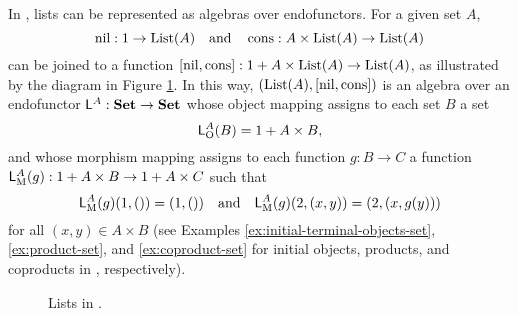\begin{example}
  \label{ex:algebra-list}


  In \set, lists can be represented as algebras over endofunctors. For
  a given set $A$,
  \begin{equation*}
    \operatorname{nil}: 1 \to \text{List}(A)
    \quad
    \text{and}
    \quad
    \operatorname{cons}: A \times \text{List}(A) \to \text{List}(A)
  \end{equation*}
  can be joined to a function $[\operatorname{nil},\operatorname{cons}]: 1 + A \times \text{List}(A)
  \to \text{List}(A)$, as illustrated by the diagram in Figure
  \ref{fig:coproduct-list}. In this way, $(\text{List}(A),[\operatorname{nil},\operatorname{cons}])$
  is an algebra over an endofunctor $\mathsf{L}^{A}: \mathbf{Set} \to \mathbf{Set}$
  whose object mapping assigns to each set $B$ a set
  \begin{equation*}
    \mathsf{L}_{\operatorname{O}}^{A}(B) = 1 + A \times B
    \text{,}
  \end{equation*}
  and whose morphism mapping assigns to each function $g: B \to C$ a
  function $\mathsf{L}_{\operatorname{M}}^{A}(g): 1 + A \times B \to 1 + A \times C$ such
  that
  \begin{equation*}
    \mathsf{L}_{\operatorname{M}}^{A}(g)(1,()) = (1,())
    \quad
    \text{and}
    \quad
    \mathsf{L}_{\operatorname{M}}^{A}(g)(2,(x,y)) = (2,(x,g(y)))
  \end{equation*}
  for all $(x,y) \in A \times B$ (see Examples
  \ref{ex:initial-terminal-objects-set}, \ref{ex:product-set}, and
  \ref{ex:coproduct-set} for initial objects, products, and coproducts
  in \set, respectively).

  \begin{figure}[htb]
    \begin{center}
    \end{center}
    \caption{Lists in \set.}
    \label{fig:coproduct-list}
  \end{figure}

\end{example}

